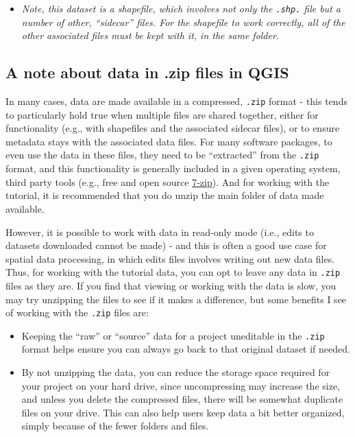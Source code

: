 \documentclass[
  letterpaper,
  DIV=11,
  numbers=noendperiod]{scrreprt}
\providecommand{\tightlist}{%
  \setlength{\itemsep}{0pt}\setlength{\parskip}{0pt}}\usepackage{longtable,booktabs,array}
\begin{document}
\begin{itemize}
\begin{itemize}
    \begin{itemize}
    \tightlist
    \item
      \emph{Note, this dataset is a shapefile, which involves not only
      the \texttt{.shp.} file but a number of other, ``sidecar'' files.
      For the shapefile to work correctly, all of the other associated
      files must be kept with it, in the same folder.}
    \end{itemize}
  \end{itemize}
\end{itemize}

\hypertarget{a-note-about-data-in-.zip-files-in-qgis}{%
\subsection{A note about data in .zip files in
QGIS}\label{a-note-about-data-in-.zip-files-in-qgis}}

In many cases, data are made available in a compressed, \texttt{.zip}
format - this tends to particularly hold true when multiple files are
shared together, either for functionality (e.g., with shapefiles and the
associated sidecar files), or to ensure metadata stays with the
associated data files. For many software packages, to even use the data
in these files, they need to be ``extracted'' from the \texttt{.zip}
format, and this functionality is generally included in a given
operating system, third party tools (e.g., free and open source
\href{https://www.7-zip.org/}{7-zip}). And for working with the
tutorial, it is recommended that you do unzip the main folder of data
made available.

However, it is possible to work with data in read-only mode (i.e., edits
to datasets downloaded cannot be made) - and this is often a good use
case for spatial data processing, in which edits files involves writing
out new data files. Thus, for working with the tutorial data, you can
opt to leave any data in \texttt{.zip} files as they are. If you find
that viewing or working with the data is slow, you may try unzipping the
files to see if it makes a difference, but some benefits I see of
working with the \texttt{.zip} files are:

\begin{itemize}
\tightlist
\item
  Keeping the ``raw'' or ``source'' data for a project uneditable in the
  \texttt{.zip} format helps ensure you can always go back to that
  original dataset if needed.
\item
  By not unzipping the data, you can reduce the storage space required
  for your project on your hard drive, since uncompressing may increase
  the size, and unless you delete the compressed files, there will be
  somewhat duplicate files on your drive. This can also help users keep
  data a bit better organized, simply because of the fewer folders and
  files.
\end{itemize}
\end{document}

